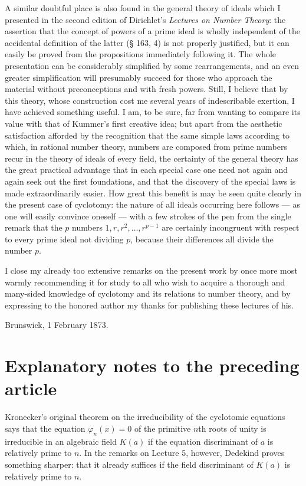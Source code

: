 \documentclass[11pt]{article}
\newcommand{\origpage}[1]{\par\vspace{0.25em}\noindent{\footnotesize\itshape [Printed page #1]}\par\vspace{0.25em}}
\begin{document}
\origpage{419}
A similar doubtful place is also found in the general theory of ideals which I presented in the second edition of Dirichlet's \textit{Lectures on Number Theory}: the assertion that the concept of powers of a prime ideal is wholly independent of the accidental definition of the latter (§ 163, 4) is not properly justified, but it can easily be proved from the propositions immediately following it. The whole presentation can be considerably simplified by some rearrangements, and an even greater simplification will presumably succeed for those who approach the material without preconceptions and with fresh powers. Still, I believe that by this theory, whose construction cost me several years of indescribable exertion, I have achieved something useful. I am, to be sure, far from wanting to compare its value with that of Kummer's first creative idea; but apart from the aesthetic satisfaction afforded by the recognition that the same simple laws according to which, in rational number theory, numbers are composed from prime numbers recur in the theory of ideals of every field, the certainty of the general theory has the great practical advantage that in each special case one need not again and again seek out the first foundations, and that the discovery of the special laws is made extraordinarily easier. How great this benefit is may be seen quite clearly in the present case of cyclotomy: the nature of all ideals occurring here follows --- as one will easily convince oneself --- with a few strokes of the pen from the single remark that the $p$ numbers $1,r,r^2,\ldots,r^{p-1}$ are certainly incongruent with respect to every prime ideal not dividing $p$, because their differences all divide the number $p$.

I close my already too extensive remarks on the present work by once more most warmly recommending it for study to all who wish to acquire a thorough and many-sided knowledge of cyclotomy and its relations to number theory, and by expressing to the honored author my thanks for publishing these lectures of his.

\begin{flushleft}Brunswick, 1 February 1873.\end{flushleft}

\origpage{420}
\section*{Explanatory notes to the preceding article}

Kronecker's original theorem on the irreducibility of the cyclotomic equations says that the equation $\varphi_n(x)=0$ of the primitive $n$th roots of unity is irreducible in an algebraic field $K(a)$ if the equation discriminant of $a$ is relatively prime to $n$. In the remarks on Lecture 5, however, Dedekind proves something sharper: that it already suffices if the field discriminant of $K(a)$ is relatively prime to $n$.
\end{document}
